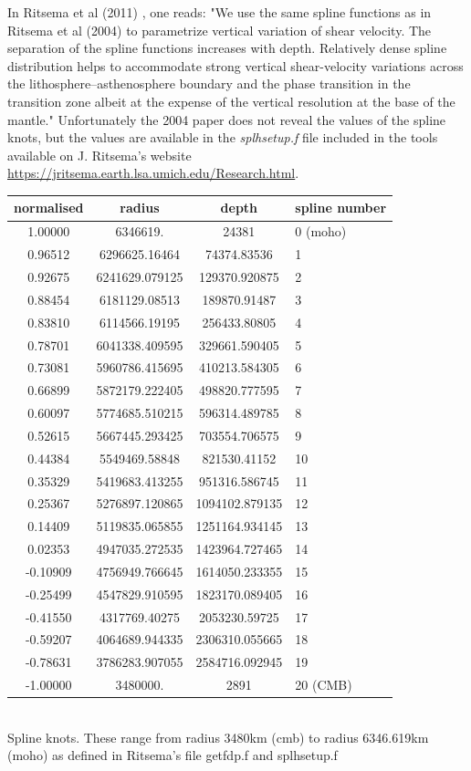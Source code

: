 In Ritsema et al (2011) \cite{ridv11}, one reads: "We use the same 
spline functions as in Ritsema et al (2004) \cite{rivw04} to parametrize vertical 
variation of shear velocity. The separation of the spline functions
increases with depth. Relatively dense spline distribution helps to
accommodate strong vertical shear-velocity variations across the
lithosphere–asthenosphere boundary and the phase transition in the
transition zone albeit at the expense of the vertical resolution at
the base of the mantle."
Unfortunately the 2004 paper does not reveal the values of the spline knots, but the values
are available in the {\sl splhsetup.f} file included in the tools available 
on J. Ritsema's website \url{https://jritsema.earth.lsa.umich.edu/Research.html}.

\begin{center}
\begin{tabular}{cccl}
\hline 
normalised & radius & depth & spline number\\
\hline 
\hline 
1.00000  & 6346619.       &  24381          &0 (moho)\\
0.96512  & 6296625.16464  &  74374.83536    &1\\
0.92675  & 6241629.079125 &  129370.920875  &2\\
0.88454  & 6181129.08513  &  189870.91487   &3\\
0.83810  & 6114566.19195  &  256433.80805   &4\\
0.78701  & 6041338.409595 &  329661.590405  &5\\
0.73081  & 5960786.415695 &  410213.584305  &6\\
0.66899  & 5872179.222405 &  498820.777595  &7\\
0.60097  & 5774685.510215 &  596314.489785  &8\\
0.52615  & 5667445.293425 &  703554.706575  &9\\
0.44384  & 5549469.58848  &  821530.41152   &10\\
0.35329  & 5419683.413255 &  951316.586745  &11\\
0.25367  & 5276897.120865 &  1094102.879135 &12\\
0.14409  & 5119835.065855 &  1251164.934145 &13\\
0.02353  & 4947035.272535 &  1423964.727465 &14\\
-0.10909 & 4756949.766645 &  1614050.233355 &15\\
-0.25499 & 4547829.910595 &  1823170.089405 &16\\
-0.41550 & 4317769.40275  &  2053230.59725  &17\\
-0.59207 & 4064689.944335 &  2306310.055665 &18\\
-0.78631 & 3786283.907055 &  2584716.092945 &19\\
-1.00000 & 3480000.       &  2891           &20  (CMB) \\
\hline
\end{tabular}\\
{\captionfont Spline knots. These range from radius 3480km (cmb) to radius 6346.619km (moho) 
as defined in Ritsema's file getfdp.f and splhsetup.f}
\end{center}

